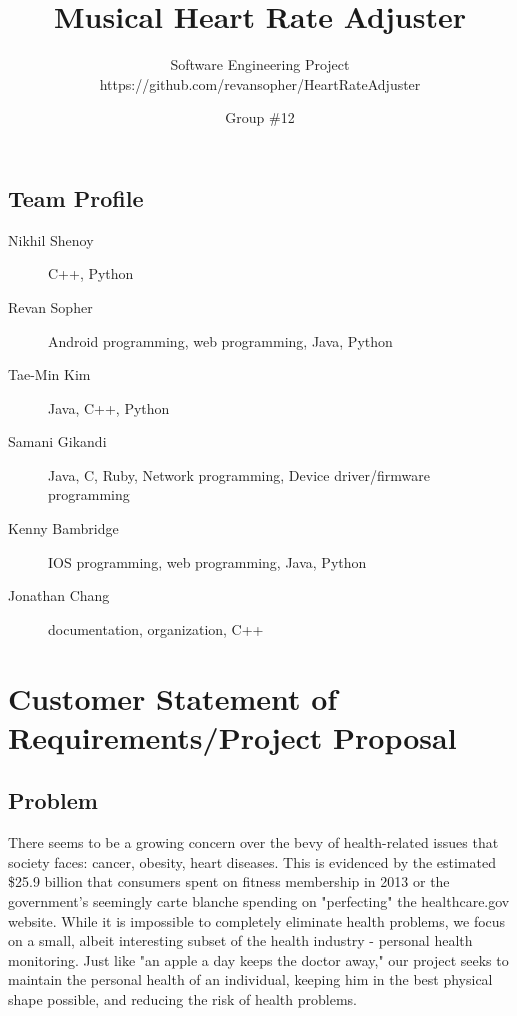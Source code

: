 \documentclass[letterpaper,english]{scrreprt}
\begin{document}
\title{Musical Heart Rate Adjuster}
\subtitle{Software Engineering Project \\ https://github.com/revansopher/HeartRateAdjuster}
\author{Group \#12}

\maketitle
 
\tableofcontents

\section*{Team Profile}
\begin{description}
	\item[Nikhil Shenoy] C++, Python
	\item[Revan Sopher] Android programming, web programming, Java, Python
	\item[Tae-Min Kim] Java, C++, Python
	\item[Samani Gikandi] Java, C, Ruby, Network programming, Device driver/firmware programming
	\item[Kenny Bambridge] IOS programming, web programming, Java, Python
	\item[Jonathan Chang] documentation, organization, C++
\end{description}
 
\chapter{Customer Statement of Requirements/Project Proposal}
 
\section{Problem}
There seems to be a growing concern over the bevy of health-related issues that society faces: cancer, obesity, heart diseases. This is evidenced by the estimated \$25.9 billion that consumers spent on fitness membership in 2013 or the government's seemingly carte blanche spending on "perfecting" the healthcare.gov website. While it is impossible to completely eliminate health problems, we focus on a small, albeit interesting subset of the health industry - personal health monitoring. Just like "an apple a day keeps the doctor away," our project seeks to maintain the personal health of an individual, keeping him in the best physical shape possible, and reducing the risk of health problems.
 
\end{document}
